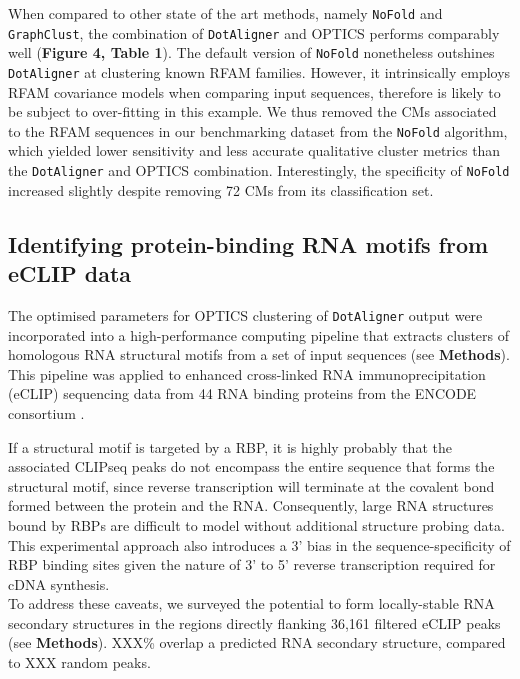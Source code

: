 \documentclass{bmcart}
\newcommand\dotaligner{\texttt{DotAligner}}
\begin{document}
When compared to other state of the art methods, namely \texttt{NoFold} and \texttt{GraphClust}, the combination of \dotaligner{} and OPTICS performs comparably well (\textbf{Figure 4, Table 1}). The default version of \texttt{NoFold} nonetheless outshines \dotaligner{} at clustering known RFAM families. However, 
it intrinsically employs RFAM covariance models when comparing input sequences, therefore is likely
to be subject to over-fitting in this example. We thus removed the CMs associated to the RFAM sequences
in our benchmarking dataset from the \texttt{NoFold} algorithm, which yielded lower sensitivity and less accurate qualitative cluster metrics than the \dotaligner{} and OPTICS combination. Interestingly, 
the specificity of  \texttt{NoFold}  increased slightly despite removing 72 CMs from its classification set. 


\subsection*{Identifying protein-binding RNA motifs from eCLIP data}
The optimised parameters for OPTICS clustering of \dotaligner{} output were incorporated into 
a high-performance computing pipeline that extracts clusters of homologous RNA structural motifs from a set of input sequences (see \textbf{Methods}).  This pipeline was applied to enhanced cross-linked 
RNA immunoprecipitation (eCLIP) sequencing data from 44 RNA binding proteins from the ENCODE consortium  \cite{van2016robust}. 

If a structural motif is targeted by a RBP, it is highly probably that the associated CLIPseq peaks 
do not encompass the entire sequence that forms the structural motif, since 
reverse transcription will terminate at the covalent bond formed between the 
protein and the RNA. Consequently, large RNA structures bound by RBPs are 
difficult to model without additional structure probing data. This experimental 
approach also introduces a 3' bias in the sequence-specificity of RBP binding sites 
given the nature of 3' to 5' reverse transcription required for cDNA synthesis.\\

To address these caveats, we surveyed the potential to form locally-stable
RNA secondary structures in the regions directly flanking 36,161 filtered eCLIP 
peaks (see \textbf{Methods}). XXX\% overlap a predicted RNA secondary structure, 
compared to XXX random peaks. \\


\end{document}
